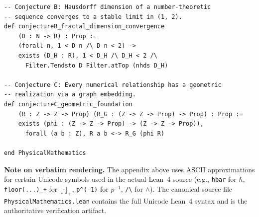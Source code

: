 \documentclass[12pt]{article}
\theoremstyle{lawstyle}
\theoremstyle{conjstyle}
\theoremstyle{predstyle}
\begin{document}
\begin{verbatim}
-- Conjecture B: Hausdorff dimension of a number-theoretic
-- sequence converges to a stable limit in (1, 2).
def conjectureB_fractal_dimension_convergence
    (D : N -> R) : Prop :=
    (forall n, 1 < D n /\ D n < 2) ->
    exists (D_H : R), 1 < D_H /\ D_H < 2 /\
      Filter.Tendsto D Filter.atTop (nhds D_H)

-- Conjecture C: Every numerical relationship has a geometric
-- realization via a graph embedding.
def conjectureC_geometric_foundation
    (R : Z -> Z -> Prop) (R_G : (Z -> Z -> Prop) -> Prop) : Prop :=
    exists (phi : (Z -> Z -> Prop) -> (Z -> Z -> Prop)),
      forall (a b : Z), R a b <-> R_G (phi R)

end PhysicalMathematics
\end{verbatim}
\endgroup

\bigskip
\noindent\textbf{Note on verbatim rendering.} The appendix above uses ASCII
approximations for certain Unicode symbols used in the actual Lean~4 source
(e.g., \texttt{hbar} for $\hbar$, \texttt{floor(...)\_+} for $\lfloor\cdot\rfloor_+$,
\texttt{p\^{}(-1)} for $p^{-1}$, \texttt{/\textbackslash} for $\wedge$).
The canonical source file \texttt{PhysicalMathematics.lean} contains the full
Unicode Lean~4 syntax and is the authoritative verification artifact.
\end{document}
